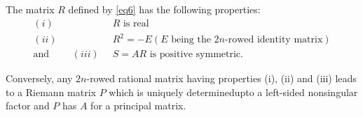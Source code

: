 \begin{proposition}\label{chap1:prop1}
The matrix $R$ defined by \eqref{eq6} has the following properties:
\begin{align*} 
(i) & \; \; R \text{ is real}\\
(ii) & \;\; R^2 = -E (E \text{ being the $2n$-rowed identity matrix})\\
\text{and }\qquad  (iii) & \;\; S = A R \text{ is positive
  symmetric}.  
\end{align*}

Conversely, any $2n$-rowed rational matrix having properties (i), (ii)
and (iii) leads to a Riemann matrix $P$ which is uniquely
determined\pageoriginale upto a left-sided nonsingular factor and $P$
has $A$ for a principal matrix.
\end{proposition}

